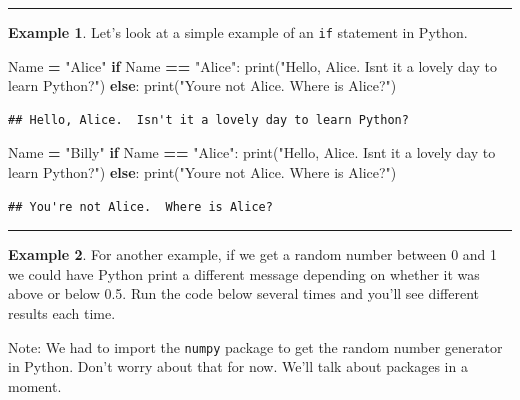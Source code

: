 \documentclass[
]{book}
\newenvironment{Shaded}{\begin{snugshade}}{\end{snugshade}}
\newcommand{\BuiltInTok}[1]{#1}
\newcommand{\ControlFlowTok}[1]{\textcolor[rgb]{0.13,0.29,0.53}{\textbf{#1}}}
\newcommand{\NormalTok}[1]{#1}
\newcommand{\OperatorTok}[1]{\textcolor[rgb]{0.81,0.36,0.00}{\textbf{#1}}}
\newcommand{\StringTok}[1]{\textcolor[rgb]{0.31,0.60,0.02}{#1}}
\theoremstyle{definition}
\theoremstyle{definition}
\newtheorem{example}{Example}[chapter]
\theoremstyle{definition}
\theoremstyle{remark}
\begin{document}
\begin{center}\rule{0.5\linewidth}{0.5pt}\end{center}

\begin{example}
\protect\hypertarget{exm:unnamed-chunk-672}{}{\label{exm:unnamed-chunk-672} }Let's look at a simple example of an \texttt{if} statement in Python.
\end{example}

\begin{Shaded}
\begin{Highlighting}[]
\NormalTok{Name }\OperatorTok{=} \StringTok{"Alice"}
\ControlFlowTok{if}\NormalTok{ Name }\OperatorTok{==} \StringTok{"Alice"}\NormalTok{:}
    \BuiltInTok{print}\NormalTok{(}\StringTok{"Hello, Alice.  Isn\textquotesingle{}t it a lovely day to learn Python?"}\NormalTok{)}
\ControlFlowTok{else}\NormalTok{:}
    \BuiltInTok{print}\NormalTok{(}\StringTok{"You\textquotesingle{}re not Alice.  Where is Alice?"}\NormalTok{)}
\end{Highlighting}
\end{Shaded}

\begin{verbatim}
## Hello, Alice.  Isn't it a lovely day to learn Python?
\end{verbatim}

\begin{Shaded}
\begin{Highlighting}[]
\NormalTok{Name }\OperatorTok{=} \StringTok{"Billy"}
\ControlFlowTok{if}\NormalTok{ Name }\OperatorTok{==} \StringTok{"Alice"}\NormalTok{:}
    \BuiltInTok{print}\NormalTok{(}\StringTok{"Hello, Alice.  Isn\textquotesingle{}t it a lovely day to learn Python?"}\NormalTok{)}
\ControlFlowTok{else}\NormalTok{:}
    \BuiltInTok{print}\NormalTok{(}\StringTok{"You\textquotesingle{}re not Alice.  Where is Alice?"}\NormalTok{)}
\end{Highlighting}
\end{Shaded}

\begin{verbatim}
## You're not Alice.  Where is Alice?
\end{verbatim}

\begin{center}\rule{0.5\linewidth}{0.5pt}\end{center}

\begin{example}
\protect\hypertarget{exm:unnamed-chunk-675}{}{\label{exm:unnamed-chunk-675} }For another example, if we get a random number between 0 and 1 we could have Python print a different message depending on whether it was above or below 0.5. Run the code below several times and you'll see different results each time.

Note: We had to import the \texttt{numpy} package to get the random number generator in Python. Don't worry about that for now. We'll talk about packages in a moment.
\end{example}
\end{document}
